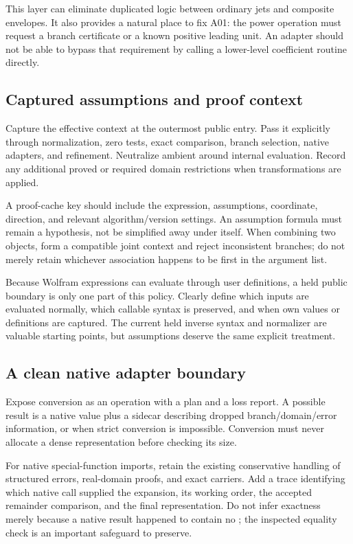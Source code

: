 This layer can eliminate duplicated logic between ordinary jets and composite envelopes. It also provides a natural place to fix A01: the power operation must request a branch certificate or a known positive leading unit. An adapter should not be able to bypass that requirement by calling a lower-level coefficient routine directly.

\subsection{Captured assumptions and proof context}
Capture the effective context at the outermost public entry. Pass it explicitly through normalization, zero tests, exact comparison, branch selection, native adapters, and refinement. Neutralize ambient  around internal evaluation. Record any additional proved or required domain restrictions when transformations are applied.

A proof-cache key should include the expression, assumptions, coordinate, direction, and relevant algorithm/version settings. An assumption formula must remain a hypothesis, not be simplified away under itself. When combining two objects, form a compatible joint context and reject inconsistent branches; do not merely retain whichever association happens to be first in the argument list.

Because Wolfram expressions can evaluate through user definitions, a held public boundary is only one part of this policy. Clearly define which inputs are evaluated normally, which callable syntax is preserved, and when own values or definitions are captured. The current held inverse syntax and normalizer are valuable starting points, but assumptions deserve the same explicit treatment.\cite{arithmetic,inverseexpressions}

\subsection{A clean native adapter boundary}
Expose conversion as an operation with a plan and a loss report. A possible result is a native value plus a sidecar describing dropped branch/domain/error information, or  when strict conversion is impossible. Conversion must never allocate a dense representation before checking its size.

For native special-function imports, retain the existing conservative handling of structured errors, real-domain proofs, and exact carriers. Add a trace identifying which native call supplied the expansion, its working order, the accepted remainder comparison, and the final representation. Do not infer exactness merely because a native result happened to contain no ; the inspected equality check is an important safeguard to preserve.\cite{native}

